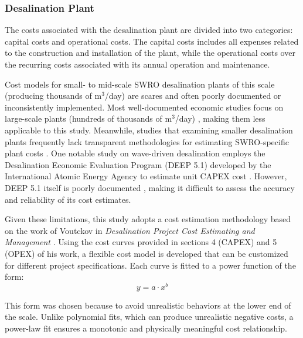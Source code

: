 \documentclass[twocolumn,10pt]{asme2e}
\begin{document}
\subsubsection{Desalination Plant}
The costs associated with the desalination plant are divided into two categories: capital costs and operational costs. The capital costs includes all expenses related to the construction and installation of the plant, while the operational costs over the recurring costs associated with its annual operation and maintenance.

Cost models for small- to mid-scale SWRO desalination plants of this scale (producing thousands of m$^3$/day) are scares and often poorly documented or inconsistently implemented. Most well-documented economic studies focus on large-scale plants (hundreds of thousands of m$^3$/day) \cite{Slocum2016,Haefner2023,roopexcurve,Wittholz2008}, making them less applicable to this study. Meanwhile, studies that examining smaller desalination plants frequently lack transparent methodologies for estimating SWRO-specific plant costs \cite{Elkadeem2024,Goekcek2016}. One notable study on wave-driven desalination employs the Desalination Economic Evaluation Program (DEEP 5.1) developed by the International Atomic Energy Agency to estimate unit CAPEX cost \cite{Yu2022}. However, DEEP 5.1 itself is poorly documented \cite{DEEP5manual}, making it difficult to assess the accuracy and reliability of its cost estimates. 

Given these limitations, this study adopts a cost estimation methodology based on the work of Voutckov in \emph{Desalination Project Cost Estimating and Management} \cite{voutch}. Using the cost curves provided in sections 4 (CAPEX) and 5 (OPEX) of his work, a flexible cost model is developed that can be customized for different project specifications. Each curve is fitted to a power function of the form:
\begin{equation}
    y = a \cdot x^b
\end{equation}

This form was chosen because to avoid unrealistic behaviors at the lower end of the scale. Unlike polynomial fits, which can produce unrealistic negative costs, a power-law fit ensures a monotonic and physically meaningful cost relationship.

\end{document}
